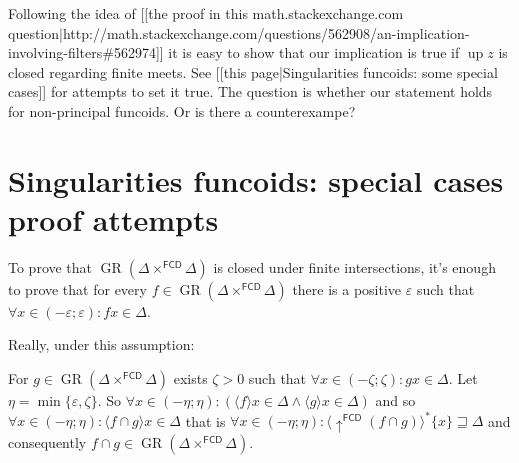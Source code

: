 Following the idea of [[the proof in this math.stackexchange.com question|http://math.stackexchange.com/questions/562908/an-implication-involving-filters\#562974]] it is easy to show that our implication is true if $\operatorname{up} z$ is closed regarding finite meets. See [[this page|Singularities funcoids: some special cases]] for attempts to set it true.
The question is whether our statement holds for non-principal funcoids. Or is there a counterexampe?

\section{Singularities funcoids: special cases proof attempts}
To prove that $\operatorname{GR} ( \Delta \times^{\mathsf{FCD}} \Delta)$ is closed under finite intersections, it's enough to prove that for every $f \in \operatorname{GR} ( \Delta \times^{\mathsf{FCD}} \Delta)$ there is a positive $\varepsilon$ such that $\forall x \in ( - \varepsilon ; \varepsilon) : f x \in \Delta$.

Really, under this assumption:

For $g \in \operatorname{GR} ( \Delta \times^{\mathsf{FCD}} \Delta)$ exists $\zeta > 0$ such that $\forall x \in ( - \zeta ; \zeta) : g x \in \Delta$. Let $\eta = \min \{ \varepsilon, \zeta \}$. So $\forall x \in ( - \eta ; \eta) : ( \langle f \rangle x \in \Delta \wedge \langle g \rangle x \in \Delta)$ and so $\forall x \in ( - \eta ; \eta) : \langle f \cap g \rangle x \in \Delta$ that is $\forall x \in ( - \eta ; \eta) : \langle \uparrow^{\mathsf{FCD}} ( f \cap g) \rangle^{\ast} \{ x \} \sqsupseteq \Delta$ and consequently $f \cap g \in \operatorname{GR} ( \Delta \times^{\mathsf{FCD}} \Delta)$.
